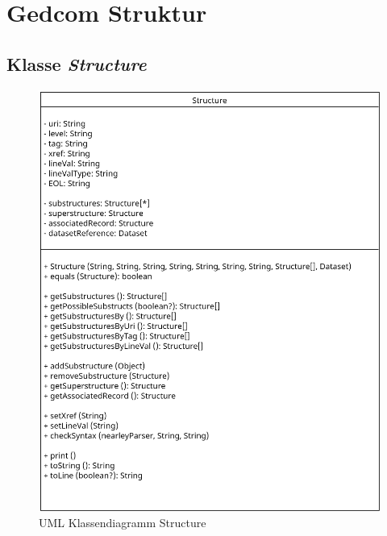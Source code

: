 \section{Gedcom Struktur}
\label{sec: Implementierung - Gedcom Struktur}
\subsection{Klasse \textit{Structure}}
\label{subsec: Implementierung - Gedcom Struktur - Klasse Structure}
\begin{figure}[h]
	\centering
	\includegraphics[width=1\textwidth]{images/UML_Class_Structure.png}
	\caption{UML Klassendiagramm Structure}
	\label{fig: UML Klassendiagramm Structure}
\end{figure}

